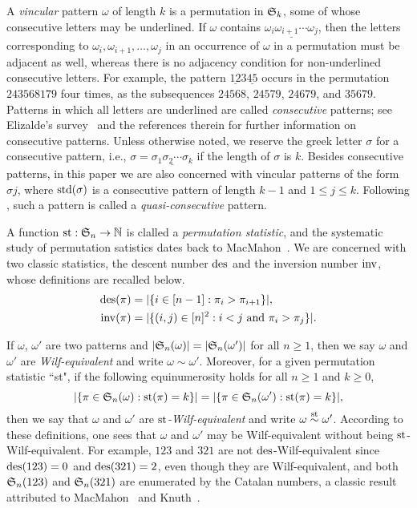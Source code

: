 A \textit{vincular} pattern $\omega $ of length $k$ is a permutation in ${\S}_k$, some of whose consecutive letters may be underlined.
If $\omega $ contains $\underline{\omega_i\omega_{i+1}\cdots \omega_{j}}$, then the letters corresponding to $\omega_i,\omega _{i+1},\ldots,\omega_{j}$ 
in an occurrence of $\omega $ in a permutation must be adjacent as well, whereas there is no adjacency condition for non-underlined consecutive letters.
For example, the pattern $\underline{12}3\underline{45}$ occurs in the permutation $243568179$ four times,
as the subsequences $24568$, $24579$, $24679$, and $35679$.
Patterns in which all letters are underlined are called \textit{consecutive} patterns; see Elizalde's survey~\cite{eliz16} and the references therein for further information on consecutive patterns. Unless otherwise noted, we reserve the greek letter $\sigma$ for a consecutive pattern, 
i.e., $\sigma=\underline{\sigma_1\sigma_2\cdots\sigma_k}$ if the length of $\sigma$ is $k$. Besides consecutive patterns, in this paper we are also concerned with vincular patterns of the form $\sigma j$, where $\std(\sigma)$ is a consecutive pattern of length $k-1$ and $1\le j\le k$. Following \cite{CN18}, such a pattern is called a \textit{quasi-consecutive} pattern.

A function $\st:\S_n \to \mathbb{N} $ is clalled a \textit{permutation statistic}, and the systematic study of permutation
satistics dates back to MacMahon~\cite{mac60}. We are concerned with two classic statistics, the descent number $\des$ and the inversion number $\inv$, whose definitions are recalled below.
\begin{align*} 
\des(\pi) &= |\{i \in [n-1]:\pi_i>\pi_{i+1}\}|,\\
\inv(\pi) &= |\{(i,j)\in [n]^2: i<j \text{ and } \pi_i>\pi_j\}|.
\end{align*}

If $\omega$, $\omega '$ are two patterns and $|\S_n(\omega )|=|\S_n(\omega ')|$ for all $n\ge 1$, then we say $\omega $ and $\omega '$ are \textit{Wilf-equivalent} and write $\omega  \sim \omega '$.
Moreover, for a given permutation statistic ``st", if the following equinumerosity holds for all $n\ge 1$ and $k\ge 0$, 
$$|\{\pi \in \S_n(\omega ): \st(\pi)=k\}|=|\{\pi \in \S_n(\omega '): \st(\pi)=k\}|,$$ 
then we say that $\omega $ and $\omega '$ are \textit{$\st$-Wilf-equivalent} and write $\omega  \overset{\st}{\sim} \omega '$. According to these definitions, one sees that $\omega $ and $\omega '$ may be Wilf-equivalent without being $\st$-Wilf-equivalent. For example, $123$ and $321$ are not $\des$-Wilf-equivalent since $\des(123)=0$ and $\des(321)=2$, even though they are Wilf-equivalent, and both $\S_n(123)$ and $\S_n(321)$ are enumerated by the Catalan numbers, a classic result attributed to MacMahon~\cite{mac60} and Knuth~\cite{knu75}.

